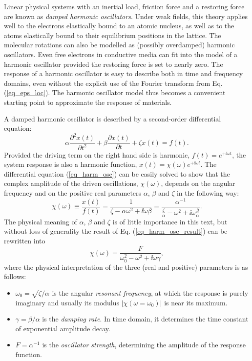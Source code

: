 Linear physical systems with an inertial load, friction force and a restoring force are known as \textit{damped harmonic oscillators}. Under weak fields, this theory applies well to the electrons elastically bound to an atomic nucleus, as well as to the atoms elastically bound to their equilibrium positions in the lattice. The molecular rotations can also be modelled as (possibly overdamped) harmonic oscillators. Even free electrons in conductive media can fit into the model of a harmonic oscillator provided the restoring force is set to nearly zero. The response of a harmonic oscillator is easy to describe both in time and frequency domains, even without the explicit use of the Fourier transform from Eq. (\ref{eq_eps_loc}). The harmonic oscillator model thus becomes a convenient starting point to approximate the response of materials.

A damped harmonic oscillator is described by a second-order differential equation:
\begin{equation} \alpha \frac{\partial^{2} x(t)}{\partial t^{2}} + \beta\frac{\partial x(t)}{\partial t} + \zeta x(t) = f(t). \label{eq_harm_osc}\end{equation}
Provided the driving term on the right hand side  is harmonic, $f(t) = e^{+\ii \omega t}$, the system response is also a harmonic function, $x(t) = \chi(\omega) e^{+\ii \omega t}$. The differential equation (\ref{eq_harm_osc}) can be easily solved to show that the complex amplitude of the driven oscillations, $\chi(\omega)$, depends on the angular frequency and on the positive real parameters $\alpha$, $\beta$ and $\zeta$ in the following way:
\begin{equation} \chi(\omega) \equiv \frac{x(t)}{f(t)} = \frac{1}{\zeta - \alpha\omega^{2} + \ii\omega\beta}  = \frac{\alpha^{-1}}{\frac{\zeta}{\alpha}-\omega^{2} + \ii\omega\frac{\beta}{\alpha}}. \label{eq_harm_osc_result}\end{equation}
The physical meaning of $\alpha$, $\beta$ and $\zeta$ is of little importance in this text, but without loss of generality the result of Eq. (\ref{eq_harm_osc_result}) can be rewritten into
\begin{equation} \chi(\omega) = \frac{F}{\omega_0^{2}-\omega^{2} + \ii\omega\gamma}, \label{eq_harm_osc_rewritten}\end{equation}
where the physical interpretation of the three (real and positive) parameters is as follows:
\begin{itemize}
 \item{$\omega_0 = \sqrt{\zeta/\alpha}$ is the angular \textit{resonant frequency}, at which the response is purely imaginary and usually its modulus $|\chi(\omega=\omega_0)|$ is near its maximum.} 
 \item{$\gamma = \beta/\alpha$ is the \textit{damping rate}. In time domain, it determines the time constant of exponential amplitude decay. } 
 \item{$F = \alpha^{-1}$ is the \textit{oscillator strength}, determining the amplitude of the response function.}
 \end{itemize}


